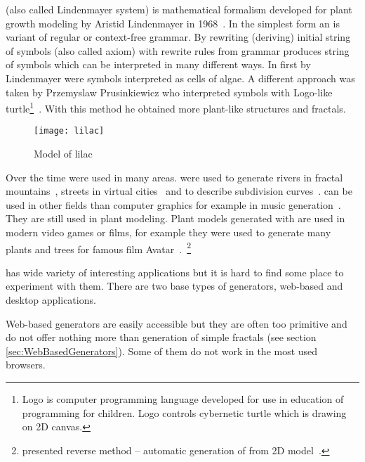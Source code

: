 
\label{sec:Introduction}

\lsystem (also called Lindenmayer system) is mathematical formalism developed for plant growth modeling by Aristid Lindenmayer in 1968~\cite{Lin68}.
In the simplest form an \lsystem is variant of regular or \mbox{context-free} grammar.
By rewriting (deriving) initial string of symbols (also called axiom) with rewrite rules from grammar \lsystem produces string of symbols which can be interpreted in many different ways.
In first \lsystems by Lindenmayer were symbols interpreted as cells of algae.
A different approach was taken by Przemyslaw Prusinkiewicz who interpreted \lsystem symbols with \mbox{Logo-like} turtle\footnote{
	Logo is computer programming language developed for use in education of programming for children.
	Logo controls cybernetic turtle which is drawing on 2D canvas.}~\cite{Pru85}.
With this method he obtained more plant-like structures and fractals.~\cite{CD93}

\begin{wrapfigure}{r}{0.5\textwidth}
	\vspace{-20pt}
	\begin{center}
	\texttt{[image: lilac]}
	\end{center}
	\caption{Model of lilac}
\end{wrapfigure}

Over the time \lsystems were used in many areas.
\lsystems were used to generate rivers in fractal mountains~\cite{PH93}, streets in virtual cities~\cite{PM01} and to describe subdivision curves~\cite{PSSK03}.
\lsystems can be used in other fields than computer graphics for example in music generation~\cite{HCJ99, Man06}.
They are still used in plant modeling.
Plant models generated with \lsystems are used in modern video games or films, for example they were used to generate many plants and trees for famous film Avatar~\cite{Wor08, Dun10}.~\footnote{\citeauthor{SBM10} presented reverse method -- automatic generation of \lsystems from 2D model~\cite{SBM10}.}

\lsystems has wide variety of interesting applications but it is hard to find some place to experiment with them.
There are two base types of \lsystem generators, web-based and desktop applications.

Web-based \lsystem generators are easily accessible but they are often too primitive and do not offer nothing more than generation of simple fractals (see section \ref{sec:WebBasedGenerators}).
Some of them do not work in the most used browsers.

